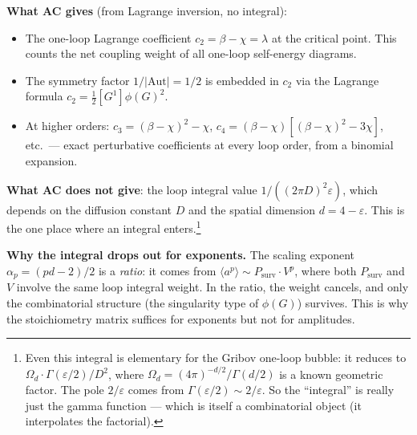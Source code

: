 \documentclass[11pt,a4paper]{article}
\theoremstyle{definition}
\newcommand{\Aut}{\mathrm{Aut}}
\begin{document}
\textbf{What AC gives} (from Lagrange inversion, no integral):
\begin{itemize}
\item The one-loop Lagrange coefficient $c_2 = \beta - \chi = \lambda$
      at the critical point. This counts the net coupling weight of all
      one-loop self-energy diagrams.
\item The symmetry factor $1/|\Aut| = 1/2$ is embedded in $c_2$ via
      the Lagrange formula $c_2 = \frac{1}{2}[G^1]\phi(G)^2$.
\item At higher orders: $c_3 = (\beta{-}\chi)^2 - \chi$,
      $c_4 = (\beta{-}\chi)[(\beta{-}\chi)^2 - 3\chi]$, etc.\ ---
      exact perturbative coefficients at every loop order, from a
      binomial expansion.
\end{itemize}

\textbf{What AC does not give}: the loop integral value
$1/((2\pi D)^2\varepsilon)$, which depends on the diffusion constant $D$
and the spatial dimension $d = 4 - \varepsilon$. This is the one place
where an integral enters.\footnote{Even this integral is elementary
for the Gribov one-loop bubble: it reduces to $\Omega_d \cdot
\Gamma(\varepsilon/2)/D^2$, where $\Omega_d = (4\pi)^{-d/2}/\Gamma(d/2)$
is a known geometric factor. The pole $2/\varepsilon$ comes from
$\Gamma(\varepsilon/2) \sim 2/\varepsilon$. So the ``integral'' is really
just the gamma function --- which is itself a combinatorial object
(it interpolates the factorial).}

\textbf{Why the integral drops out for exponents.}
The scaling exponent $\alpha_p = (pd - 2)/2$ is a \emph{ratio}: it comes
from $\langle a^p \rangle \sim P_{\text{surv}} \cdot V^p$, where both
$P_{\text{surv}}$ and $V$ involve the same loop integral weight. In the
ratio, the weight cancels, and only the combinatorial structure (the
singularity type of $\phi(G)$) survives. This is why the stoichiometry
matrix suffices for exponents but not for amplitudes.
\end{document}
